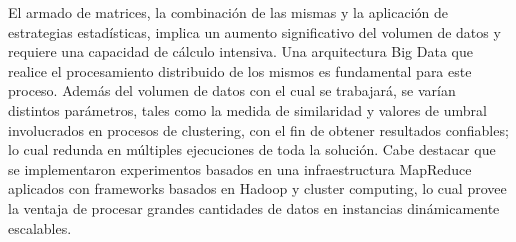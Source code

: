 \bigskip El armado de matrices, la combinación de las mismas y la aplicación de estrategias estadísticas, implica un aumento significativo del volumen de datos y requiere una capacidad de cálculo intensiva. Una arquitectura Big Data que realice el procesamiento distribuido de los mismos es fundamental para este proceso. Además del volumen de datos con el cual se trabajará, se varían distintos parámetros, tales como la medida de similaridad y valores de umbral involucrados en procesos de clustering, con el fin de obtener resultados confiables; lo cual redunda en múltiples ejecuciones de toda la solución. Cabe destacar que se implementaron experimentos basados en una infraestructura MapReduce aplicados con frameworks basados en Hadoop y cluster computing, lo cual provee la ventaja de procesar grandes cantidades de datos en instancias dinámicamente escalables.